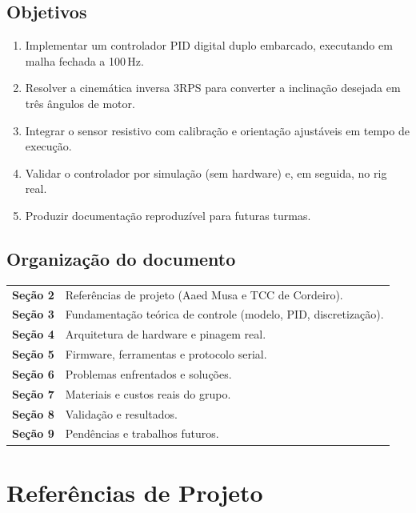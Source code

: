 \documentclass[11pt,a4paper,oneside]{article}
\newcommand{\rowstyle}{\rowcolor{rowgray}}
\begin{document}
\subsection{Objetivos}

\begin{enumerate}
  \item Implementar um controlador PID digital duplo embarcado, executando em
  malha fechada a 100\,Hz.
  \item Resolver a cinemática inversa 3RPS para converter a inclinação desejada
  em três ângulos de motor.
  \item Integrar o sensor resistivo com calibração e orientação ajustáveis em
  tempo de execução.
  \item Validar o controlador por simulação (sem hardware) e, em seguida, no
  rig real.
  \item Produzir documentação reproduzível para futuras turmas.
\end{enumerate}

\subsection{Organização do documento}

\begin{center}
\small
\begin{tabularx}{\textwidth}{>{\bfseries\color{primary}}l X}
\toprule
Seção 2 & Referências de projeto (Aaed Musa e TCC de Cordeiro). \\
\rowstyle Seção 3 & Fundamentação teórica de controle (modelo, PID, discretização). \\
Seção 4 & Arquitetura de hardware e pinagem real. \\
\rowstyle Seção 5 & Firmware, ferramentas e protocolo serial. \\
Seção 6 & Problemas enfrentados e soluções. \\
\rowstyle Seção 7 & Materiais e custos reais do grupo. \\
Seção 8 & Validação e resultados. \\
\rowstyle Seção 9 & Pendências e trabalhos futuros. \\
\bottomrule
\end{tabularx}
\end{center}

\section{Referências de Projeto}
\end{document}
